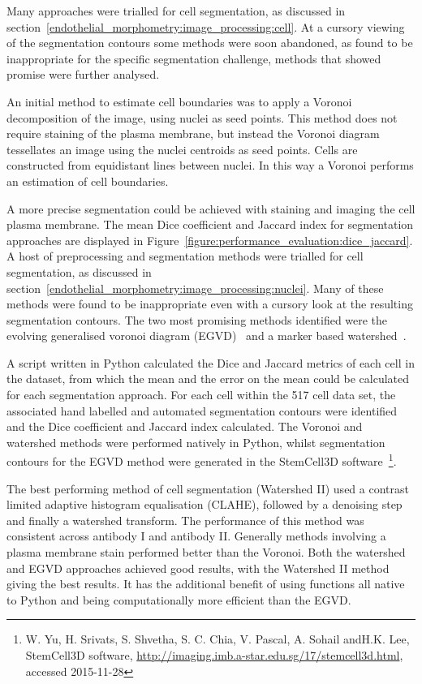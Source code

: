 Many approaches were trialled for cell segmentation, as discussed in section~\ref{endothelial_morphometry:image_processing:cell}. At a cursory viewing of the segmentation contours some methods were soon abandoned, as found to be inappropriate for the specific segmentation challenge, methods that showed promise were further analysed.

An initial method to estimate cell boundaries was to apply a Voronoi decomposition of the image, using  nuclei as seed points. This method does not require staining of the plasma membrane, but instead the Voronoi diagram tessellates an image using the nuclei centroids as seed points. Cells are constructed from equidistant lines between nuclei. In this way a Voronoi performs an estimation of cell boundaries.

A more precise segmentation could be achieved with staining and imaging the cell plasma membrane. The mean Dice coefficient and Jaccard index for segmentation approaches are displayed in Figure~\ref{figure:performance_evaluation:dice_jaccard}. A host of preprocessing and segmentation methods were trialled for cell segmentation, as discussed in section~\ref{endothelial_morphometry:image_processing:nuclei}. Many of these methods were found to be inappropriate even with a cursory look at the resulting segmentation contours. The two most promising methods identified were the evolving generalised voronoi diagram (EGVD)~\cite{Yu2010} and a marker based watershed~\cite{Roerdink2000}.

A script written in Python calculated the Dice and Jaccard metrics of each cell in the dataset, from which the mean and the error on the mean could be calculated for each segmentation approach. For each cell within the 517 cell data set, the associated hand labelled and automated segmentation contours were identified and the Dice coefficient and Jaccard index calculated. The Voronoi and watershed methods were performed natively in Python, whilst segmentation contours for the EGVD method  were generated in the StemCell3D software~\footnote{W. Yu, H. Srivats, S. Shvetha, S. C. Chia, V. Pascal, A. Sohail andH.K. Lee, StemCell3D software, \url{http://imaging.imb.a-star.edu.sg/17/stemcell3d.html}, accessed 2015-11-28}.

The best performing method of cell segmentation (Watershed II) used a contrast limited adaptive histogram equalisation (CLAHE), followed by a denoising step and finally a watershed transform. The performance of this method was consistent across antibody I and antibody II. Generally methods involving a plasma membrane stain performed better than the Voronoi. Both the watershed and EGVD approaches achieved good results, with the Watershed II method giving the best results. It has the additional benefit of using functions all native to Python and being computationally more efficient than the EGVD.

